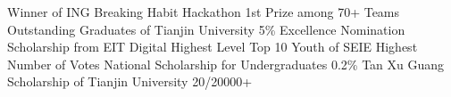 %
%
%


\begin{scholarship}
	{Winner of ING Breaking Habit Hackathon}
	{1st Prize among 70+ Teams}
					{Outstanding Graduates of Tianjin University}
                    {5\%}
					{Excellence Nomination Scholarship from EIT Digital}
                    {Highest Level}
					{Top 10 Youth of SEIE}
                    {Highest Number of Votes}
					{National Scholarship for Undergraduates}
                    {0.2\%}
    				{Tan Xu Guang Scholarship of Tianjin University}
                    {20/20000+}
\end{scholarship}